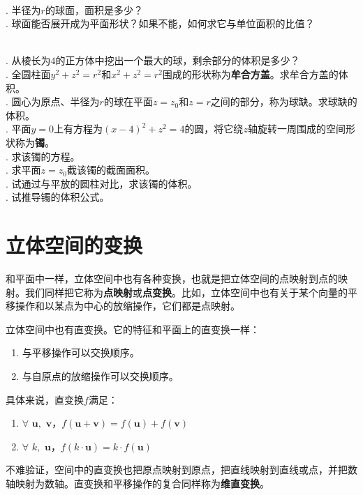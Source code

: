 \documentclass[12pt,UTF8]{ctexbook}
\begin{document}
\begin{sk}
    \mbox{}\\
    . 半径为$r$的球面，面积是多少？\\
    . 球面能否展开成为平面形状？如果不能，如何求它与单位面积的比值？
\end{sk}

\begin{xt}
    \mbox{}\\
    . 从棱长为$4$的正方体中挖出一个最大的球，剩余部分的体积是多少？\\
    . 全圆柱面$y^2+z^2=r^2$和$x^2+z^2=r^2$围成的形状称为\textbf{牟合方盖}。求牟合方盖的体积。\\
    . 圆心为原点、半径为$r$的球在平面$z = z_0$和$z = r$之间的部分，称为球缺。求球缺的体积。 \\
    . 平面$y = 0$上有方程为$(x - 4)^2 + z^2 = 4$的圆，将它绕$z$轴旋转一周围成的空间形状称为\textbf{镯}。\\
    . 求该镯的方程。\\
    . 求平面$z = z_0$截该镯的截面面积。\\ 
    . 试通过与平放的圆柱对比，求该镯的体积。\\
    . 试推导镯的体积公式。
\end{xt}

\chapter{立体空间的变换}

和平面中一样，立体空间中也有各种变换，也就是把立体空间的点映射到点的映射。我们同样把它称为\textbf{点映射}或\textbf{点变换}。比如，立体空间中也有关于某个向量的平移操作和以某点为中心的放缩操作，它们都是点映射。

立体空间中也有直变换。它的特征和平面上的直变换一样：
\begin{enumerate}
    \item 与平移操作可以交换顺序。
    \item 与自原点的放缩操作可以交换顺序。
\end{enumerate}
具体来说，直变换$f$满足：
\begin{enumerate}
    \item $\forall \,\,\mathbf{u}, \,\,\mathbf{v}$，$f(\mathbf{u} + \mathbf{v}) = f(\mathbf{u}) + f(\mathbf{v})$
    \item $\forall \,\,k, \,\, \mathbf{u}$，$f(k\cdot \mathbf{u}) = k \cdot f(\mathbf{u})$
\end{enumerate}
不难验证，空间中的直变换也把原点映射到原点，把直线映射到直线或点，并把数轴映射为数轴。直变换和平移操作的复合同样称为\textbf{维直变换}。
\end{document}

